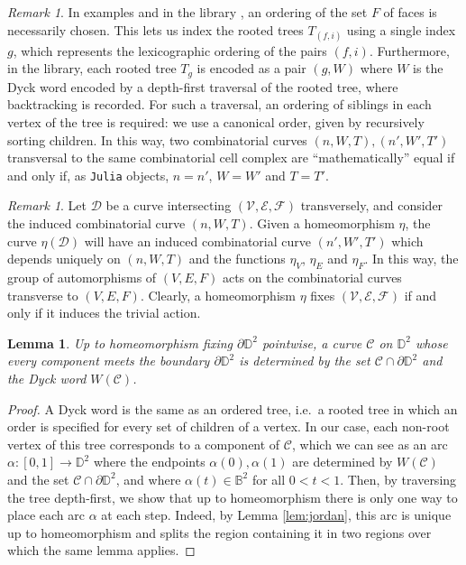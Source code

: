 \documentclass[11pt,reqno]{amsart}
\theoremstyle{plain}
\newtheorem{lemma}[subsection]{Lemma}
\theoremstyle{definition}
\theoremstyle{remark}
\newtheorem{remark}[subsection]{Remark}
\numberwithin{equation}{subsection}
\newcommand*{\bbB}{\mathbb{B}}
\newcommand*{\bbD}{\mathbb{D}}
\newcommand*{\calC}{\mathcal{C}}
\newcommand*{\calD}{\mathcal{D}}
\newcommand*{\calE}{\mathcal{E}}
\newcommand*{\calF}{\mathcal{F}}
\newcommand*{\calV}{\mathcal{V}}
\begin{document}
\begin{remark} \label{rem:conventions}
    In examples and in the library , an ordering of the set $F$ of faces is necessarily chosen. This lets us index the rooted trees $T_{(f,i)}$ using a single index $g$, which represents the lexicographic ordering of the pairs $(f,i)$. Furthermore, in the library, each rooted tree $T_g$ is encoded as a pair $(g,W)$ where $W$ is the Dyck word encoded by a depth-first traversal of the rooted tree, where backtracking is recorded. For such a traversal, an ordering of siblings in each vertex of the tree is required: we use a canonical order, given by recursively sorting children. In this way, two combinatorial curves $(n,W,T),(n',W',T')$ transversal to the same combinatorial cell complex are ``mathematically'' equal if and only if, as \texttt{Julia} objects, $n=n'$, $W=W'$ and $T=T'$.
\end{remark}

\begin{remark}\label{rem:act}
    Let $\calD$ be a curve intersecting $(\calV,\calE,\calF)$ transversely, and consider the induced combinatorial curve $(n,W,T)$. Given a homeomorphism $\eta$, the curve $\eta(\calD)$ will have an induced combinatorial curve $(n',W',T')$ which depends uniquely on $(n,W,T)$ and the functions $\eta_V$, $\eta_E$ and $\eta_F$. In this way, the group of automorphisms of $(V,E,F)$ acts on the combinatorial curves transverse to $(V,E,F)$. Clearly, a homeomorphism $\eta$ fixes $(\calV,\calE,\calF)$ if and only if it induces the trivial action.
\end{remark}

\begin{lemma}\label{lem:disk}
    Up to homeomorphism fixing $\partial\bbD^2$ pointwise, a curve $\calC$ on $\bbD^2$ whose every component meets the boundary $\partial\bbD^2$ is determined by the set $\calC\cap\partial\bbD^2$ and the Dyck word $W(\calC)$.
\end{lemma}

\begin{proof}
    A Dyck word is the same as an ordered tree, i.e.\ a rooted tree in which an order is specified for every set of children of a vertex. In our case, each non-root vertex of this tree corresponds to a component of $\calC$, which we can see as an arc $\alpha\colon[0,1]\to\bbD^2$ where the endpoints $\alpha(0),\alpha(1)$ are determined by $W(\calC)$ and the set $\calC\cap\partial\bbD^2$, and where $\alpha(t)\in\bbB^2$ for all $0<t<1$. Then, by traversing the tree depth-first, we show that up to homeomorphism there is only one way to place each arc $\alpha$ at each step. Indeed, by Lemma \ref{lem:jordan}, this arc is unique up to homeomorphism and splits the region containing it in two regions over which the same lemma applies.
\end{proof}
\end{document}
